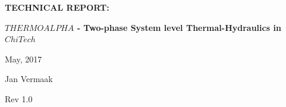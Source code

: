 \documentclass[11pt,letterpaper,titlepage]{article}
\begin{document}
\newcommand{\NSCDOCNUMBR}{NSC-REP-15-X}         %
\newcommand{\NSCDOCSUBJT}{TECHNICAL REPORT: }   %
\newcommand{\NSCDOCTITLE}{$THERMOALPHA$ - Two-phase System level Thermal-Hydraulics in $ChiTech$}       %
\newcommand{\NSCDOCDATE} {May, 2017}    %
\newcommand{\NSCDOCREV}  {Rev 1.0} %



\begin{titlepage}
	\pagestyle{fancy}
	\vspace*{1.0cm}
	\centering
	\vspace{1cm}
	\vspace{.25cm}
	{\Large\bfseries  \NSCDOCSUBJT \par} 
	{\Large\bfseries \NSCDOCTITLE  \par}
	\vspace{1cm}
	{\Large \NSCDOCDATE \par}
	\vspace{1.0cm}
	{\Large Jan Vermaak \par}
	{\Large \NSCDOCREV \par}
		

	\begin{center}
		\begin{minipage}[c]{0.45\textwidth}
			\begin{figure}[H]
			

\end{figure}
\end{minipage}
\end{center}
\end{titlepage}
\end{document}
